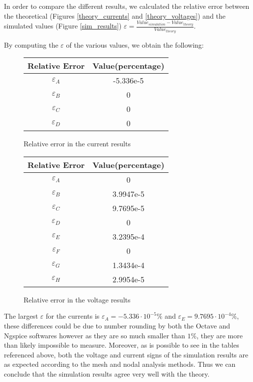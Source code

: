\label{conclusion}
\hspace{12pt} In order to compare the different results, we calculated the relative error between the theoretical (Figures \ref{theory_currents} and \ref{theory_voltages}) and the simulated values (Figure \ref{sim_results}) $\varepsilon = \frac{Value_{simulation} - Value_{theory}}{Value_{theory}}$.

By computing the $\varepsilon$ of the various values, we obtain the following:

\begin{figure}[h]
	\centering
	\begin{tabular}{|c|c|}
		\hline
		Relative Error    &  Value(percentage) \\
		\hline
		$\varepsilon_A$   &  -5.336e-5 \\
		\hline
		$\varepsilon_B$   &      0     \\
		\hline
		$\varepsilon_C$   &      0     \\
		\hline
		$\varepsilon_D$   &      0     \\
		\hline		
	\end{tabular}
	\caption{Relative error in the current results}
	\label{current_error}
\end{figure}

\vspace{30pt}

\begin{figure}[h]
	\centering
	\begin{tabular}{|c|c|}
		\hline
		Relative Error & Value(percentage)  \\
		\hline
		$\varepsilon_A$   &     0      \\
		\hline
		$\varepsilon_B$   &  3.9947e-5 \\
		\hline
		$\varepsilon_C$   &  9.7695e-5 \\
		\hline
		$\varepsilon_D$   &     0      \\
		\hline
		$\varepsilon_E$   &  3.2395e-4 \\
		\hline
		$\varepsilon_F$   &     0      \\
		\hline
		$\varepsilon_G$   &  1.3434e-4 \\
		\hline
		$\varepsilon_H$   &  2.9954e-5 \\
		\hline
	\end{tabular}
	\caption{Relative error in the voltage results}
	\label{voltage_error}
\end{figure}

The largest $\varepsilon$ for the currents is $\varepsilon_A = -5.336 \cdot 10^{-5}\%$ and $\varepsilon_E = 9.7695 \cdot 10^{-4}\%$, these differences could be due to number rounding by both the Octave and Ngspice softwares however as they are so much smaller than $1\%$, they are more than likely impossible to measure. Moreover, as is possible to see in the tables referenced above, both the voltage and current signs of the simulation results are as expected according to the mesh and nodal analysis methods. Thus we can conclude that the simulation results agree very well with the theory.
